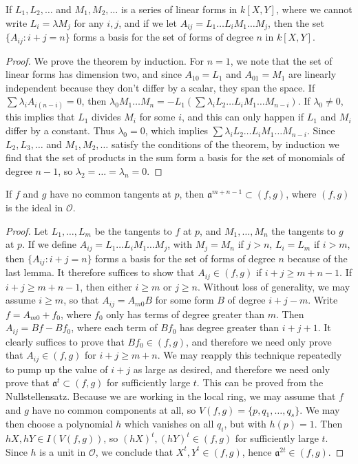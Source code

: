 \begin{lemma}
    If $L_1, L_2, \dots$ and $M_1, M_2, \dots$ is a series of linear forms in $k[X,Y]$, where we cannot write $L_i = \lambda M_j$ for any $i,j$, and if we let $A_{ij} = L_1 \dots L_i M_1 \dots M_j$, then the set $\{ A_{ij} : i + j = n \}$ forms a basis for the set of forms of degree $n$ in $k[X,Y]$.
\end{lemma}
\begin{proof}
    We prove the theorem by induction. For $n = 1$, we note that the set of linear forms has dimension two, and since $A_{10} = L_1$ and $A_{01} = M_1$ are linearly independent because they don't differ by a scalar, they span the space. If $\sum \lambda_i A_{i(n-i)} = 0$, then $\lambda_0 M_1 \dots M_n = -L_1(\sum \lambda_i L_2 \dots L_i M_1 \dots M_{n-i})$. If $\lambda_0 \neq 0$, this implies that $L_1$ divides $M_i$ for some $i$, and this can only happen if $L_1$ and $M_i$ differ by a constant. Thus $\lambda_0 = 0$, which implies $\sum \lambda_i L_2 \dots L_i M_1 \dots M_{n-i}$. Since $L_2, L_3, \dots$ and $M_1, M_2, \dots$ satisfy the conditions of the theorem, by induction we find that the set of products in the sum form a basis for the set of monomials of degree $n-1$, so $\lambda_2 = \dots = \lambda_n = 0$.
\end{proof}

\begin{lemma}
    If $f$ and $g$ have no common tangents at $p$, then $\mathfrak{a}^{m+n-1} \subset (f,g)$, where $(f,g)$ is the ideal in $\mathcal{O}$.
\end{lemma}
\begin{proof}
    Let $L_1, \dots, L_m$ be the tangents to $f$ at $p$, and $M_1, \dots, M_n$ the tangents to $g$ at $p$. If we define $A_{ij} = L_1 \dots L_i M_1 \dots M_j$, with $M_j = M_n$ if $j > n$, $L_i = L_m$ if $i > m$, then $\{ A_{ij}: i + j = n \}$ forms a basis for the set of forms of degree $n$ because of the last lemma. It therefore suffices to show that $A_{ij} \in (f,g)$ if $i + j \geq m + n - 1$. If $i + j \geq m + n - 1$, then either $i \geq m$ or $j \geq n$. Without loss of generality, we may assume $i \geq m$, so that $A_{ij} = A_{m0}B$ for some form $B$ of degree $i + j - m$. Write $f = A_{m0} + f_0$, where $f_0$ only has terms of degree greater than $m$. Then $A_{ij} = Bf - Bf_0$, where each term of $Bf_0$ has degree greater than $i + j + 1$. It clearly suffices to prove that $Bf_0 \in (f,g)$, and therefore we need only prove that $A_{ij} \in (f,g)$ for $i + j \geq m + n$. We may reapply this technique repeatedly to pump up the value of $i + j$ as large as desired, and therefore we need only prove that $\mathfrak{a}^t \subset (f,g)$ for sufficiently large $t$. This can be proved from the Nullstellensatz. Because we are working in the local ring, we may assume that $f$ and $g$ have no common components at all, so $V(f,g) = \{ p, q_1, \dots, q_s \}$. We may then choose a polynomial $h$ which vanishes on all $q_i$, but with $h(p) = 1$. Then $hX, hY \in I(V(f,g))$, so $(hX)^t, (hY)^t \in (f,g)$ for sufficiently large $t$. Since $h$ is a unit in $\mathcal{O}$, we conclude that $X^t, Y^t \in (f,g)$, hence $\mathfrak{a}^{2t} \in (f,g)$.
\end{proof}

